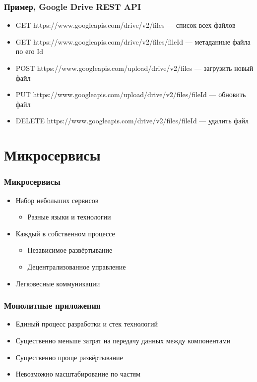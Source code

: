 \documentclass[xetex,mathserif,serif]{beamer}
\begin{document}
    \begin{frame}
        \frametitle{Пример, Google Drive REST API}
        \begin{itemize}
            \item GET https://www.googleapis.com/drive/v2/files --- список всех файлов
            \item GET https://www.googleapis.com/drive/v2/files/fileId --- метаданные файла по его Id
            \item POST https://www.googleapis.com/upload/drive/v2/files — загрузить новый файл
            \item PUT https://www.googleapis.com/upload/drive/v2/files/fileId --- обновить файл
            \item DELETE https://www.googleapis.com/drive/v2/files/fileId --- удалить файл
        \end{itemize}
    \end{frame}

    \section{Микросервисы}

    \begin{frame}
        \frametitle{Микросервисы}
        \begin{itemize}
            \item Набор небольших сервисов
            \begin{itemize}
                \item Разные языки и технологии
            \end{itemize}
            \item Каждый в собственном процессе
            \begin{itemize}
                \item Независимое развёртывание
                \item Децентрализованное управление
            \end{itemize}
            \item Легковесные коммуникации
        \end{itemize}
    \end{frame}

    \begin{frame}
        \frametitle{Монолитные приложения}
        \begin{itemize}
            \item Единый процесс разработки и стек технологий
            \item Существенно меньше затрат на передачу данных между компонентами
            \item Существенно проще развёртывание
            \item Невозможно масштабирование по частям
        \end{itemize}
    \end{frame}
\end{document}
